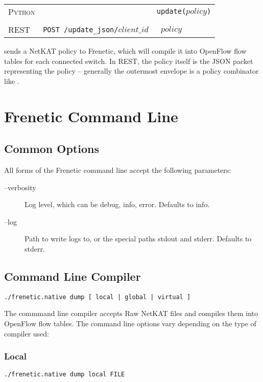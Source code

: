 \bigskip
\begin{tabularx}{\linewidth}{llX}
\textsc{Python} &  & \texttt{update($policy$)} \\ \\
\textsc{REST} & \texttt{POST /update\_json/$client\_id$} & 
  \texttt{ $policy$ } 
\end{tabularx}

 sends a NetKAT policy to Frenetic, which will compile it into OpenFlow flow tables for
each connected switch.  In REST, the policy itself is the JSON packet representing the policy -- generally
the outermost envelope is a policy combinator like .

\section{Frenetic Command Line}

\subsection{Common Options}

All forms of the Frenetic command line accept the following parameters:

\begin{description}
\item[--verbosity] Log level, which can be debug, info, error.  Defaults to info.   
\item[--log] Path to write logs to, or the special paths stdout and stderr.  Defaults to stderr.  
\end{description}

\subsection{Command Line Compiler}

\begin{verbatim}
./frenetic.native dump [ local | global | virtual ]
\end{verbatim}

The commmand line compiler accepts Raw NetKAT files and compiles them into OpenFlow flow tables.
The command line options vary depending on the type of compiler used:

\subsubsection{Local}

\begin{verbatim}
./frenetic.native dump local FILE
\end{verbatim}

